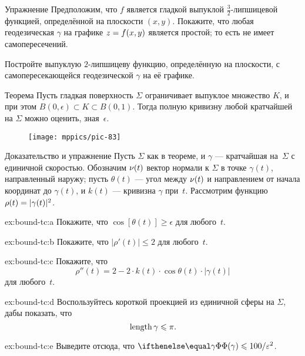 \begin{thm}{Упражнение}\label{ex:ruf-bound-mountain}
Предположим, что $f$ является гладкой выпуклой $\tfrac32$-липшицевой функцией, определённой на плоскости $(x,y)$.
Покажите, что любая геодезическая $\gamma$ на графике $z\z=f(x,y)$ является простой; то есть не имеет самопересечений.

{\sloppy

Постройте выпуклую $2$-липшицеву функцию, определённую на плоскости,
с самопересекающейся геодезической $\gamma$ на её графике.

}

\end{thm}



\begin{thm}{Теорема}\label{thm:tc-of-mingeod}
Пусть гладкая поверхность $\Sigma$ ограничивает выпуклое множество $K$, и при этом $B(0,\epsilon)\subset K\subset B(0,1)$.
Тогда полную кривизну любой кратчайшей на $\Sigma$ можно оценить, зная~$\epsilon$.
\end{thm}

{

\begin{wrapfigure}{r}{48 mm}
\vskip4mm
\centering
\texttt{[image: mppics/pic-83]}
\vskip-0mm
\end{wrapfigure}

\begin{thm}{Доказательство и упражнение}\label{ex:bound-tc}
Пусть $\Sigma$ как в теореме, и $\gamma$ --- кратчайшая на~$\Sigma$ с единичной скоростью.
Обозначим $\nu(t)$ вектор нормали к $\Sigma$ в точке $\gamma(t)$, направленный наружу;
пусть $\theta(t)$ --- угол между $\nu(t)$ и направлением от начала координат до $\gamma(t)$,
и 
$k(t)$ --- кривизна $\gamma$ при~$t$.
Рассмотрим функцию $\rho(t)\z=|\gamma(t)|^2$.


\begin{subthm}{ex:bound-tc:a}
Покажите, что $\cos[\theta(t)]\ge \epsilon$ для любого~$t$.
\end{subthm}

\begin{subthm}{ex:bound-tc:b}
Покажите, что $|\rho'(t)|\le 2$ для любого~$t$.
\end{subthm}

\begin{subthm}{ex:bound-tc:c}
Покажите, что
\[\rho''(t)=2-2\cdot k(t)\cdot \cos \theta(t)\cdot |\gamma(t)|\]
для любого~$t$.
\end{subthm}

\begin{subthm}{ex:bound-tc:d}
Воспользуйтесь короткой проекцией из единичной сферы на $\Sigma$, дабы показать, что
\[\mathop{\rm length}\nolimits \gamma\leqslant \pi.\]
\end{subthm}

\begin{subthm}{ex:bound-tc:e}
Выведите отсюда, что $\tc\gamma\le 100/\epsilon^2$.
\end{subthm}

\end{thm}

}

